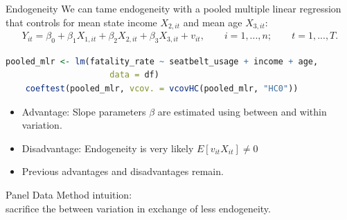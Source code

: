 \documentclass[9pt,aspectratio=169]{beamer}
\begin{document}

\begin{frame}[fragile]{Endogeneity}
\linespread{1.3}\selectfont %
    We can tame endogeneity with a pooled multiple linear regression that controls for mean state income $X_{2,it}$ and mean age $X_{3,it}$:
    \begin{align*}
    Y_{it} = \beta_0 + \beta_1 X_{1,it} + \beta_2 X_{2,it} + \beta_3 X_{3,it} + v_{it} , \quad \quad i = 1, ... , n; \quad \quad t = 1, ... , T. 
    \end{align*}
    \begin{lstlisting}[language=R]
    pooled_mlr <- lm(fatality_rate ~ seatbelt_usage + income + age, 
                     data = df) 
    coeftest(pooled_mlr, vcov. = vcovHC(pooled_mlr, "HC0"))
    \end{lstlisting}
    \pause
    \begin{itemize}
        \item Advantage: Slope parameters $\beta$ are estimated using \alert{between} and within variation.
        \item Disadvantage: \alert{Endogeneity} is very likely $E[v_{it} X_{it}] \neq 0$
        \item[$\rightarrow$] Previous advantages and disadvantages remain. 
    \end{itemize}
    \pause
    \begin{center}
        Panel Data Method intuition: \\
        sacrifice the \alert{between} variation in exchange of less \alert{endogeneity}.
    \end{center}
\end{frame}
\end{document}
